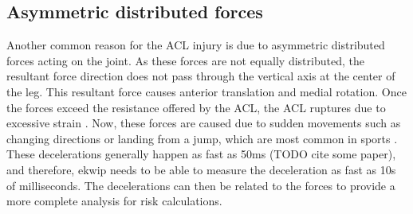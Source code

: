 \subsection{Asymmetric distributed forces}
Another common reason for the ACL injury is due to asymmetric distributed forces acting on the joint. As these forces are not equally distributed, the resultant force direction does not pass through the vertical axis at the center of the leg. This resultant force causes anterior translation and medial rotation. Once the forces exceed the resistance offered by the ACL,  the ACL ruptures due to excessive strain \cite{griffin}. Now, these forces are caused due to sudden movements such as changing directions or landing from a jump, which are most common in sports \cite{griffin}. These decelerations generally happen as fast as 50ms (TODO cite some paper), and therefore, ekwip needs to be able to measure the deceleration as fast as 10s of milliseconds. The decelerations can then be related to the forces to provide a more complete analysis for risk calculations.